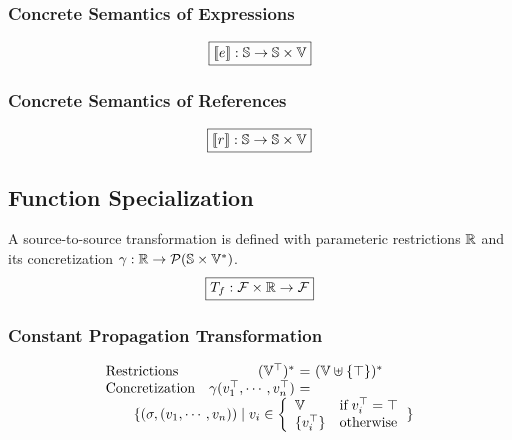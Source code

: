 \subsubsection{Concrete Semantics of Expressions}

\[
  \framebox{$\sem{\expr}: \stset \rightarrow \stset \times \valset$}
\]

\todo



\subsubsection{Concrete Semantics of References}

\[
  \framebox{$\sem{\refer}: \stset \rightarrow \stset \times \valset$}
\]

\todo





\subsection{Function Specialization}

\todo

A source-to-source transformation is defined with parameteric restrictions
$\mathbb{R}$ and its concretization $\gamma: \mathbb{R} \rightarrow
\mathcal{P}(\mathbb{S} \times \mathbb{V}^*)$.
\[
  \framebox{$\transf: \funcset \times \restrictset \rightarrow \funcset$}
\]

\todo



\subsubsection{Constant Propagation Transformation}
\[
  \begin{array}{lr@{~}c@{~}l}
    \text{Restrictions} & (\valoptset)^* &=& (\valset \uplus \{ \top \})^*\\
    \text{Concretization} & \gamma(\valopt_1, \cdots, \valopt_n) &=& \\
    \multicolumn{4}{l}{\qquad \{
      (\st, (\val_1, \cdots, \val_n)) \mid
      \val_i \in \left\{
        \begin{array}{ll}
          \valset & \text{if} \; \valopt_i = \top\\
          \{ \valopt_i \} & \text{otherwise}\\
        \end{array}
      \right.
    \}}\\
  \end{array}
\]

